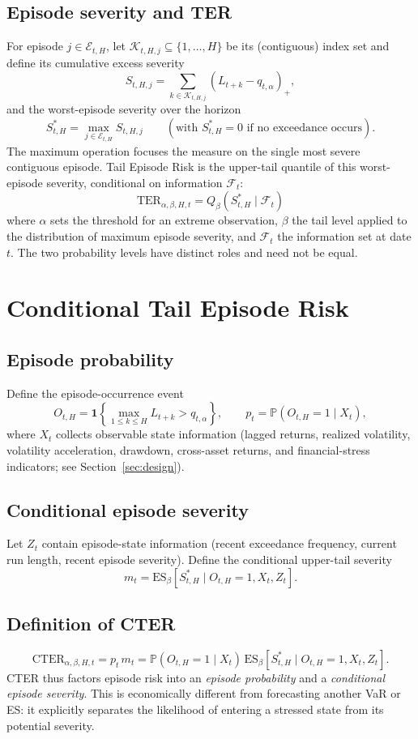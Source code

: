 \documentclass[11pt]{article}
\newcommand{\Prob}{\mathbb{P}}
\newcommand{\ES}{\mathrm{ES}}
\newcommand{\TER}{\mathrm{TER}}
\newcommand{\CTER}{\mathrm{CTER}}
\newcommand{\ind}{\mathbf{1}}
\begin{document}
\subsection{Episode severity and TER}
For episode $j\in\mathcal E_{t,H}$, let $\mathcal K_{t,H,j}\subseteq\{1,\dots,H\}$ be its (contiguous) index
set and define its cumulative excess severity
\[
S_{t,H,j}=\sum_{k\in\mathcal K_{t,H,j}}(L_{t+k}-q_{t,\alpha})_+ ,
\]
and the worst-episode severity over the horizon
\[
S^{*}_{t,H}=\max_{j\in\mathcal E_{t,H}} S_{t,H,j}
\qquad(\text{with }S^{*}_{t,H}=0\text{ if no exceedance occurs}).
\]
The maximum operation focuses the measure on the single most severe contiguous episode. Tail Episode Risk
is the upper-tail quantile of this worst-episode severity, conditional on information $\mathcal F_t$:
\[
\boxed{\;\TER_{\alpha,\beta,H,t}=Q_\beta\!\left(S^{*}_{t,H}\mid\mathcal F_t\right)\;}
\]
where $\alpha$ sets the threshold for an extreme observation, $\beta$ the tail level applied to the
distribution of maximum episode severity, and $\mathcal F_t$ the information set at date $t$. The two
probability levels have distinct roles and need not be equal.

\section{Conditional Tail Episode Risk}\label{sec:cter}

\subsection{Episode probability}
Define the episode-occurrence event
\[
O_{t,H}=\ind\!\left\{\max_{1\le k\le H}L_{t+k}>q_{t,\alpha}\right\},
\qquad p_t=\Prob(O_{t,H}=1\mid X_t),
\]
where $X_t$ collects observable state information (lagged returns, realized volatility, volatility
acceleration, drawdown, cross-asset returns, and financial-stress indicators; see
Section~\ref{sec:design}).

\subsection{Conditional episode severity}
Let $Z_t$ contain episode-state information (recent exceedance frequency, current run length, recent
episode severity). Define the conditional upper-tail severity
\[
m_t=\ES_\beta\!\left[S^{*}_{t,H}\mid O_{t,H}=1, X_t, Z_t\right].
\]

\subsection{Definition of CTER}
\[
\boxed{\;\CTER_{\alpha,\beta,H,t}=p_t\,m_t
=\Prob(O_{t,H}=1\mid X_t)\,\ES_\beta\!\left[S^{*}_{t,H}\mid O_{t,H}=1,X_t,Z_t\right].\;}
\]
CTER thus factors episode risk into an \emph{episode probability} and a \emph{conditional episode
severity}. This is economically different from forecasting another VaR or ES: it explicitly separates the
likelihood of entering a stressed state from its potential severity.
\end{document}
